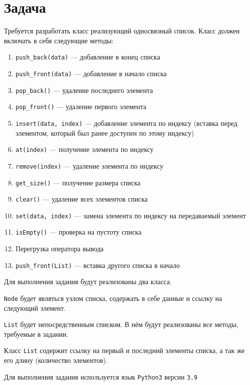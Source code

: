 \section*{Задача}

Требуется разработать класс реализующий односвязный список. 
Класс должен включать в себя следующие методы:

\begin{enumerate}
    \item \verb|push_back(data)| --- добавление в конец списка
    \item \verb|push_front(data)| --- добавление в начало списка
    \item \verb|pop_back()| --- удаление последнего элемента
    \item \verb|pop_front()| --- удаление первого элемента
    \item \verb|insert(data, index)| --- добавление элемента по индексу (вставка перед элементом, который был ранее доступен по этому индексу)
    \item \verb|at(index)| --- получение элемента по индексу
    \item \verb|remove(index)| --- удаление элемента по индексу
    \item \verb|get_size()| --- получение размера списка
    \item \verb|clear()| --- удаление всех элементов списка
    \item \verb|set(data, index)| --- замена элемента по индексу на передаваемый элемент
    \item \verb|isEmpty()| --- проверка на пустоту списка
    \item Перегрузка оператора вывода
    \item \verb|push_front(List)| --- вставка другого списка в начало
\end{enumerate}

Для выполнения задания будут реализованы два класса.

\verb|Node| будет являться узлом списка, содержать в себе данные и ссылку на следующий элемент.

\verb|List| будет непосредственным списком.
В нём будут реализованы все методы, требуемые в задании.

Класс \verb|List| содержит ссылку на первый и последний элементы списка, а так же его длину (количество элементов).

Для выполнения задания используется язык \verb|Python3| версии \verb|3.9|